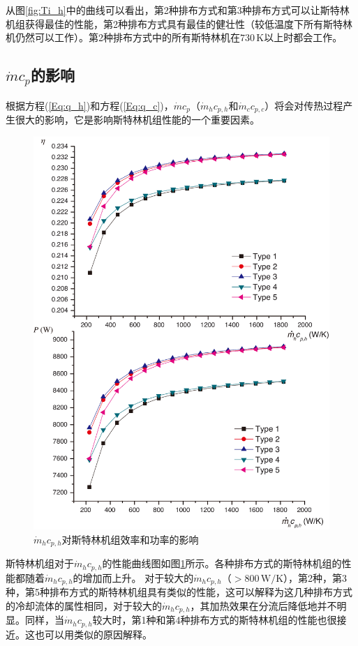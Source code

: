 从图\ref{fig:Ti_h}中的曲线可以看出，第2种排布方式和第3种排布方式可以让斯特林机组获得最佳的性能，第2种排布方式具有最佳的健壮性（较低温度下所有斯特林机仍然可以工作）。第2种排布方式中的所有斯特林机在$730\,\mathrm{K}$以上时都会工作。

\subsection{$\dot{m}c_p$的影响}

根据方程(\ref{Eq:q_h})和方程(\ref{Eq:q_c})，$\dot{m}c_p$（$\dot{m}_hc_{p,h}$和$\dot{m}_cc_{p,c}$）将会对传热过程产生很大的影响，它是影响斯特林机组性能的一个重要因素。

\noindent \begin{figure}[htbp]
\begin{center}
	\includegraphics[width = 0.7\columnwidth]{fig/qm_hcp_h}
	\caption{$\dot{m}_hc_{p,h}$对斯特林机组效率和功率的影响}
	\label{fig:qm_hcp_h}
\end{center}
\end{figure}
斯特林机组对于$\dot{m}_hc_{p,h}$的性能曲线图如图\ref{fig:qm_hcp_h}所示。各种排布方式的斯特林机组的性能都随着$\dot{m}_hc_{p,h}$的增加而上升。
对于较大的$\dot{m}_hc_{p,h}$（$> 800\,\mathrm{W/K}$），第2种，第3种，第5种排布方式的斯特林机组具有类似的性能，这可以解释为这几种排布方式的冷却流体的属性相同，对于较大的$\dot{m}_hc_{p,h}$，其加热效果在分流后降低地并不明显。同样，当$\dot{m}_hc_{p,h}$较大时，第1种和第4种排布方式的斯特林机组的性能也很接近。这也可以用类似的原因解释。

